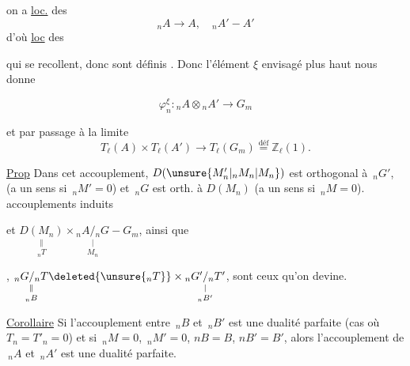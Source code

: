 

on a \uline{loc.} des 
\[{}_nA\longrightarrow A,\quad {}_nA'\mathbin{-}A'\]
d'où \uline{loc} des 


qui se recollent, donc sont définis . Donc l'élément $\xi$ envisagé plus haut nous donne

\[\varphi_n^\xi:{}_nA\otimes{}_nA'\longrightarrow G_m\]

et par passage à la limite
\[T_\ell(A)\times T_\ell(A')\longrightarrow T_\ell(G_m)\overset{\text{déf}}{=}\mathbb Z_\ell(1).\]

\uline{Prop} Dans cet accouplement, $D(\unsure{M'_n|{}_nM_n|M_n})$ est orthogonal à $\,{}_nG'$,  (a un sens si $\,{}_nM'=0$) et  $\,{}_nG$ est orth. à $D(M_n)$ (a un sens si $\,{}_nM=0$).  accouplements induits 


et $\underset{{}_nT}{\underset{\Vert}{D(M_n)}}\times\underset{M_n}{\underset{|}{{}_nA/{}_nG}}\mathbin{-}G_m$, ainsi que

, $\underset{{}_nB}{\underset{\Vert}{{}_nG/{}_nT}}\deleted{\unsure{{}_nT}}\times\underset{{}_nB'}{\underset{|}{{}_nG'/{}_nT'}}$, sont ceux qu'on devine.

\uline{Corollaire} Si l'accouplement entre $\,{}_nB$ et $\,{}_nB'$ est une dualité parfaite (cas où $T_n=T'_n=0$)  et si $\,{}_nM=0$, $\,{}_nM'=0$, $nB=B$, $nB'=B'$, alors l'accouplement de $\,{}_nA$ et $\,{}_nA'$ est une dualité parfaite.
